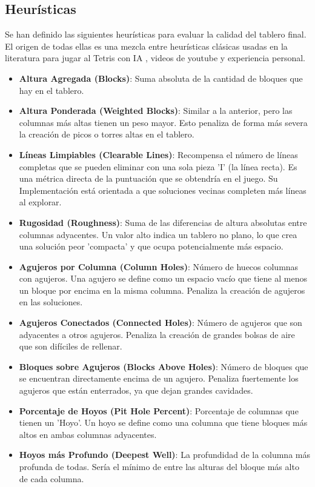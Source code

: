 \documentclass[11pt,spanish,listoffigures,listoftables]{tfgetsinf}
\begin{document}
\subsection{Heurísticas}
Se han definido las siguientes heurísticas para evaluar la calidad del tablero final. El origen de todas ellas es una mezcla entre heurísticas clásicas usadas en la literatura para jugar al Tetris con IA \cite{}, videos de youtube \cite{} y experiencia personal.

\begin{itemize}
    \item \textbf{Altura Agregada (Blocks)}: Suma absoluta de la cantidad de bloques que hay en el tablero. 
    \item \textbf{Altura Ponderada (Weighted Blocks)}: Similar a la anterior, pero las columnas más altas tienen un peso mayor. Esto penaliza de forma más severa la creación de picos o torres altas en el tablero.
    \item \textbf{Líneas Limpiables (Clearable Lines)}: Recompensa el número de líneas completas que se pueden eliminar con una sola pieza 'I' (la línea recta). Es una métrica directa de la puntuación que se obtendría en el juego. Su Implementación está orientada a que soluciones vecinas completen más líneas al explorar.
    \item \textbf{Rugosidad (Roughness)}: Suma de las diferencias de altura absolutas entre columnas adyacentes. Un valor alto indica un tablero no plano, lo que crea una solución peor 'compacta' y que ocupa potencialmente más espacio.
    \item \textbf{Agujeros por Columna (Column Holes)}: Número de huecos columnas con agujeros. Una agujero se define como un espacio vacío que tiene al menos un bloque por encima en la misma columna. Penaliza la creación de agujeros en las soluciones.
    \item \textbf{Agujeros Conectados (Connected Holes)}: Número de agujeros que son adyacentes a otros agujeros. Penaliza la creación de grandes bolsas de aire que son difíciles de rellenar.
    \item \textbf{Bloques sobre Agujeros (Blocks Above Holes)}: Número de bloques que se encuentran directamente encima de un agujero. Penaliza fuertemente los agujeros que están enterrados, ya que dejan grandes cavidades.
    \item \textbf{Porcentaje de Hoyos (Pit Hole Percent)}: Porcentaje de columnas que tienen un 'Hoyo'. Un hoyo se define como una columna que tiene bloques más altos en ambas columnas adyacentes. 
    \item \textbf{Hoyos más Profundo (Deepest Well)}: La profundidad de la columna más profunda de todas. Sería el mínimo de entre las alturas del bloque más alto de cada columna.
\end{itemize}
\end{document}
